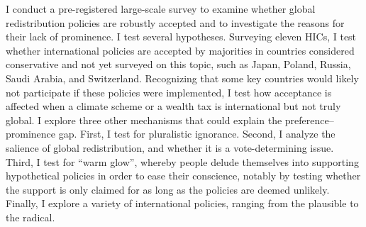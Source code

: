 \documentclass[12pt,english]{article}
\begin{document}
\begin{bibunit}
I conduct a pre-registered large-scale survey to examine whether global redistribution policies are robustly accepted and to investigate the reasons for their lack of prominence. I test several hypotheses. Surveying eleven HICs, I test whether international policies are accepted by majorities in countries considered conservative and not yet surveyed on this topic, such as Japan, Poland, Russia, Saudi Arabia, and Switzerland. Recognizing that some key countries would likely not participate if these policies were implemented, I test how acceptance is affected when a climate scheme or a wealth tax is international but not truly global. I explore three other %
mechanisms that could explain the  preference--prominence gap. 
First, I test for pluralistic ignorance. Second, I analyze the salience of global redistribution, and whether it is a vote-determining issue. Third, I test for ``warm glow'', whereby people delude themselves into supporting hypothetical policies in order to ease their conscience, notably by testing whether the support is only claimed for as long as the policies are deemed unlikely. Finally, I explore a variety of international policies, ranging from the plausible to the radical. %


\end{bibunit}
\end{document}
